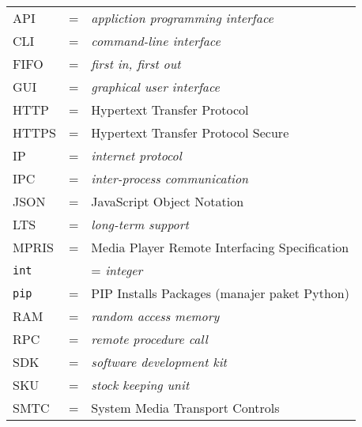 \begin{tabular}{llp{3in}}
    API & \hspace{1.5cm} = & \textit{appliction programming interface}\\
    CLI & \hspace{1.5cm} = & \textit{command-line interface}\\
    FIFO & \hspace{1.5cm} = & \textit{first in, first out}\\
    GUI & \hspace{1.5cm} = & \textit{graphical user interface}\\
    HTTP & \hspace{1.5cm} = & Hypertext Transfer Protocol\\
    HTTPS & \hspace{1.5cm} = & Hypertext Transfer Protocol Secure\\
    IP & \hspace{1.5cm} = & \textit{internet protocol}\\
    IPC & \hspace{1.5cm} = & \textit{inter-process communication}\\
    JSON & \hspace{1.5cm} = & JavaScript Object Notation\\
    LTS & \hspace{1.5cm} = & \textit{long-term support}\\
    MPRIS & \hspace{1.5cm} = & Media Player Remote Interfacing Specification\\
    \verb|int| & \hspace{1.5cm} & = \textit{integer}\\
    \verb|pip| & \hspace{1.5cm} = & PIP Installs Packages (manajer paket Python)\\
    RAM & \hspace{1.5cm} = & \textit{random access memory}\\
    RPC & \hspace{1.5cm} = & \textit{remote procedure call}\\
    SDK & \hspace{1.5cm} = & \textit{software development kit}\\
    SKU & \hspace{1.5cm} = & \textit{stock keeping unit}\\
    SMTC & \hspace {1.5cm} = & System Media Transport Controls\\

\end{tabular}
